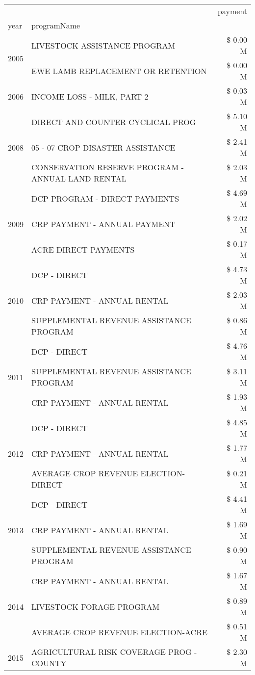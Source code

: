 \begin{tabular}{llr}
\toprule
 &  & payment \\
year & programName &  \\
\midrule
\multirow[t]{2}{*}{2005} & LIVESTOCK ASSISTANCE PROGRAM & \$ 0.00 M \\
 & EWE LAMB REPLACEMENT OR RETENTION & \$ 0.00 M \\
\cline{1-3}
2006 & INCOME LOSS - MILK, PART 2 & \$ 0.03 M \\
\cline{1-3}
\multirow[t]{3}{*}{2008} & DIRECT AND COUNTER CYCLICAL PROG & \$ 5.10 M \\
 & 05 - 07 CROP DISASTER ASSISTANCE & \$ 2.41 M \\
 & CONSERVATION RESERVE PROGRAM - ANNUAL LAND RENTAL & \$ 2.03 M \\
\cline{1-3}
\multirow[t]{3}{*}{2009} & DCP PROGRAM - DIRECT PAYMENTS & \$ 4.69 M \\
 & CRP PAYMENT - ANNUAL PAYMENT & \$ 2.02 M \\
 & ACRE DIRECT PAYMENTS & \$ 0.17 M \\
\cline{1-3}
\multirow[t]{3}{*}{2010} & DCP - DIRECT & \$ 4.73 M \\
 & CRP PAYMENT - ANNUAL RENTAL & \$ 2.03 M \\
 & SUPPLEMENTAL REVENUE ASSISTANCE PROGRAM & \$ 0.86 M \\
\cline{1-3}
\multirow[t]{3}{*}{2011} & DCP - DIRECT & \$ 4.76 M \\
 & SUPPLEMENTAL REVENUE ASSISTANCE PROGRAM & \$ 3.11 M \\
 & CRP PAYMENT - ANNUAL RENTAL & \$ 1.93 M \\
\cline{1-3}
\multirow[t]{3}{*}{2012} & DCP - DIRECT & \$ 4.85 M \\
 & CRP PAYMENT - ANNUAL RENTAL & \$ 1.77 M \\
 & AVERAGE CROP REVENUE ELECTION-DIRECT & \$ 0.21 M \\
\cline{1-3}
\multirow[t]{3}{*}{2013} & DCP - DIRECT & \$ 4.41 M \\
 & CRP PAYMENT - ANNUAL RENTAL & \$ 1.69 M \\
 & SUPPLEMENTAL REVENUE ASSISTANCE PROGRAM & \$ 0.90 M \\
\cline{1-3}
\multirow[t]{3}{*}{2014} & CRP PAYMENT - ANNUAL RENTAL & \$ 1.67 M \\
 & LIVESTOCK FORAGE PROGRAM & \$ 0.89 M \\
 & AVERAGE CROP REVENUE ELECTION-ACRE & \$ 0.51 M \\
\cline{1-3}
\multirow[t]{3}{*}{2015} & AGRICULTURAL RISK COVERAGE PROG - COUNTY & \$ 2.30 M \\

\end{tabular}
